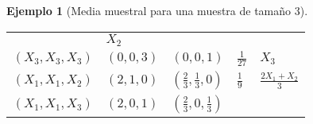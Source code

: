 \documentclass[
]{book}
\theoremstyle{break}
\theoremstyle{definition}
\theoremstyle{definition}
\newtheorem{example}{Ejemplo}[chapter]
\theoremstyle{definition}
\theoremstyle{remark}
\begin{document}
\begin{example}[Media muestral para una muestra de tamaño 3]
\begin{longtable}[]{@{}lllll@{}}
\begin{minipage}[t]{0.17\columnwidth}
\end{minipage} & \begin{minipage}[t]{0.18\columnwidth}\raggedright
\(X_2\)\strut
\end{minipage}\tabularnewline
\begin{minipage}[t]{0.18\columnwidth}\raggedright
\(\left( X_3,X_3,X_3 \right)\)\strut
\end{minipage} & \begin{minipage}[t]{0.16\columnwidth}\raggedright
\(\left( 0,0,3 \right)\)\strut
\end{minipage} & \begin{minipage}[t]{0.16\columnwidth}\raggedright
\(\left(0,0,1 \right)\)\strut
\end{minipage} & \begin{minipage}[t]{0.17\columnwidth}\raggedright
\(\frac{1}{27}\)\strut
\end{minipage} & \begin{minipage}[t]{0.18\columnwidth}\raggedright
\(X_3\)\strut
\end{minipage}\tabularnewline
\begin{minipage}[t]{0.18\columnwidth}\raggedright
\(\left( X_1,X_1,X_2 \right)\)\strut
\end{minipage} & \begin{minipage}[t]{0.16\columnwidth}\raggedright
\(\left( 2,1,0 \right)\)\strut
\end{minipage} & \begin{minipage}[t]{0.16\columnwidth}\raggedright
\(\left( \frac{2}{3},\frac{1}{3},0 \right)\)\strut
\end{minipage} & \begin{minipage}[t]{0.17\columnwidth}\raggedright
\(\frac{1}{9}\)\strut
\end{minipage} & \begin{minipage}[t]{0.18\columnwidth}\raggedright
\(\frac{2X_1+X_2}{3}\)\strut
\end{minipage}\tabularnewline
\begin{minipage}[t]{0.18\columnwidth}\raggedright
\(\left( X_1,X_1,X_3 \right)\)\strut
\end{minipage} & \begin{minipage}[t]{0.16\columnwidth}\raggedright
\(\left( 2,0,1 \right)\)\strut
\end{minipage} & \begin{minipage}[t]{0.16\columnwidth}\raggedright
\(\left( \frac{2}{3},0,\frac{1}{3} \right)\)\strut
\end{minipage} & \begin{minipage}[t]{0.17\columnwidth}\raggedright

\end{minipage}
\end{longtable}
\end{example}
\end{document}
